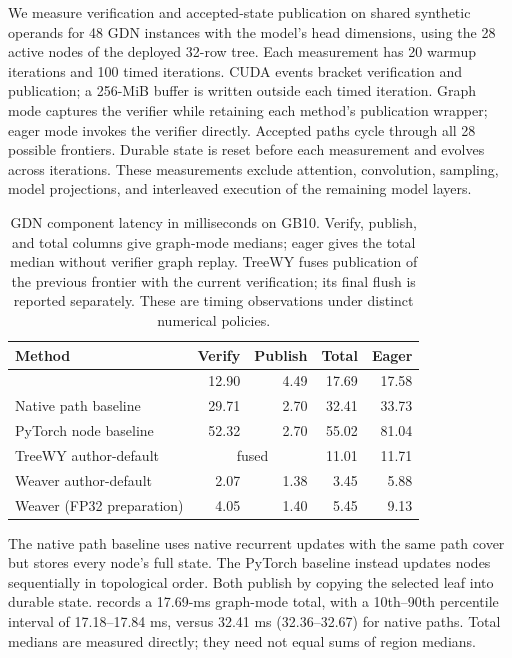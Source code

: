 We measure verification and accepted-state publication on shared synthetic operands for 48 GDN instances with the model's head dimensions, using the 28 active nodes of the deployed 32-row tree. Each measurement has 20 warmup iterations and 100 timed iterations. CUDA events bracket verification and publication; a 256-MiB buffer is written outside each timed iteration. Graph mode captures the verifier while retaining each method's publication wrapper; eager mode invokes the verifier directly. Accepted paths cycle through all 28 possible frontiers. Durable state is reset before each measurement and evolves across iterations. These measurements exclude attention, convolution, sampling, model projections, and interleaved execution of the remaining model layers.

\begin{table}[t]
\caption{GDN component latency in milliseconds on GB10. Verify, publish, and total columns give graph-mode medians; eager gives the total median without verifier graph replay. TreeWY fuses publication of the previous frontier with the current verification; its final flush is reported separately. These are timing observations under distinct numerical policies.}
\label{tab:mechanism-times}
\centering\small
\setlength{\tabcolsep}{3pt}
\begin{tabular}{@{}lrrrr@{}}
\toprule
Method & Verify & Publish & Total & Eager \\
\midrule
\sys{} & 12.90 & 4.49 & 17.69 & 17.58 \\
Native path baseline & 29.71 & 2.70 & 32.41 & 33.73 \\
PyTorch node baseline & 52.32 & 2.70 & 55.02 & 81.04 \\
TreeWY author-default & \multicolumn{2}{c}{fused} & 11.01 & 11.71 \\
Weaver author-default & 2.07 & 1.38 & 3.45 & 5.88 \\
Weaver (FP32 preparation) & 4.05 & 1.40 & 5.45 & 9.13 \\
\bottomrule
\end{tabular}
\end{table}

The native path baseline uses native recurrent updates with the same path cover but stores every node's full state. The PyTorch baseline instead updates nodes sequentially in topological order. Both publish by copying the selected leaf into durable state. \sys{} records a 17.69-ms graph-mode total, with a 10th--90th percentile interval of 17.18--17.84 ms, versus 32.41 ms (32.36--32.67) for native paths. Total medians are measured directly; they need not equal sums of region medians.

